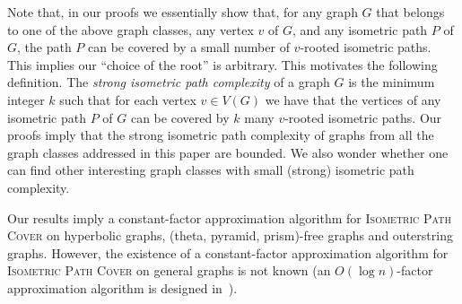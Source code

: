 \documentclass[a4paper]{article}
\newcommand{\IPC}{\textsc{Isometric Path Cover}\xspace}
\newcommand{\ipco}[1]{ipco\left(#1\right)}
\begin{document}
Note that, in our proofs we essentially show that, for any graph $G$ that belongs to one of the above graph classes, any vertex $v$ of $G$, and any isometric path $P$ of $G$, the path $P$ can be covered by a small number of $v$-rooted isometric paths. This implies our ``choice of the root'' is arbitrary. This motivates the following definition. The \emph{strong isometric path complexity} of a graph $G$%
is the minimum integer $k$ such that for each vertex $v\in V(G)$ we have that the vertices of any isometric path $P$ of $G$ can be covered by $k$ many $v$-rooted isometric paths. Our proofs imply that the strong isometric path complexity of graphs from all the graph classes addressed in this paper are bounded. 
We also wonder whether one can find other interesting graph classes with small (strong) isometric path complexity. 

Our results imply a constant-factor approximation algorithm for \IPC on hyperbolic graphs, (theta, pyramid, prism)-free graphs and outerstring graphs. However, the existence of a constant-factor approximation algorithm for \IPC on general graphs is not known (an $O(\log n)$-factor approximation algorithm is designed in~\cite{TG21}).








\end{document}
